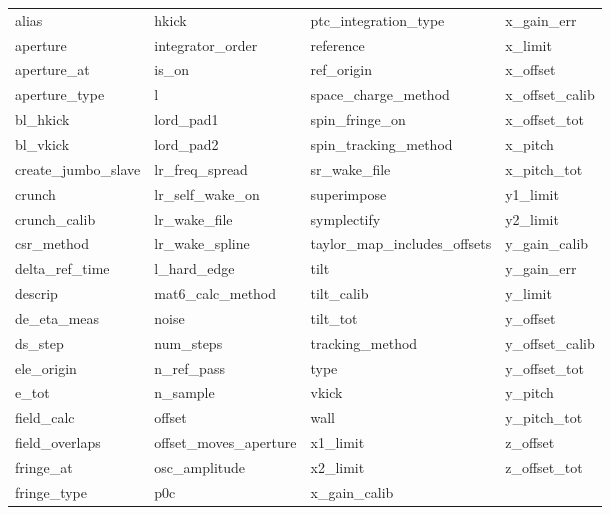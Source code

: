  \begin{tabular}{llll} \toprule
alias                       & hkick                       & ptc_integration_type        & x_gain_err                  \\
aperture                    & integrator_order            & reference                   & x_limit                     \\
aperture_at                 & is_on                       & ref_origin                  & x_offset                    \\
aperture_type               & l                           & space_charge_method         & x_offset_calib              \\
bl_hkick                    & lord_pad1                   & spin_fringe_on              & x_offset_tot                \\
bl_vkick                    & lord_pad2                   & spin_tracking_method        & x_pitch                     \\
create_jumbo_slave          & lr_freq_spread              & sr_wake_file                & x_pitch_tot                 \\
crunch                      & lr_self_wake_on             & superimpose                 & y1_limit                    \\
crunch_calib                & lr_wake_file                & symplectify                 & y2_limit                    \\
csr_method                  & lr_wake_spline              & taylor_map_includes_offsets & y_gain_calib                \\
delta_ref_time              & l_hard_edge                 & tilt                        & y_gain_err                  \\
descrip                     & mat6_calc_method            & tilt_calib                  & y_limit                     \\
de_eta_meas                 & noise                       & tilt_tot                    & y_offset                    \\
ds_step                     & num_steps                   & tracking_method             & y_offset_calib              \\
ele_origin                  & n_ref_pass                  & type                        & y_offset_tot                \\
e_tot                       & n_sample                    & vkick                       & y_pitch                     \\
field_calc                  & offset                      & wall                        & y_pitch_tot                 \\
field_overlaps              & offset_moves_aperture       & x1_limit                    & z_offset                    \\
fringe_at                   & osc_amplitude               & x2_limit                    & z_offset_tot                \\
fringe_type                 & p0c                         & x_gain_calib                &                             \\
 \bottomrule
 \end{tabular}

